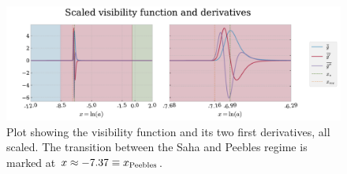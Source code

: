 \documentclass[10pt,a4paper]{article}
\begin{document}
\begin{figure}[ht]
    \centering
    \includegraphics[scale=0.5]{../figs/visibility_functions.pdf}
    \caption{Plot showing the visibility function and its two first derivatives, all scaled. The transition between the Saha and Peebles regime is marked at $x\approx-7.37 \equiv x_{\rm{Peebles}}$.}
    \label{fig:g}
\end{figure}

\pagebreak


\end{document}
